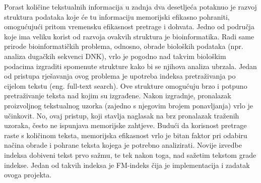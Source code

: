 Porast količine tekstualnih informacija u zadnja dva desetljeća potaknuo je razvoj struktura podataka koje će tu informaciju memorijski efikasno pohraniti, omogućujući pritom vremensku efikasnost pretrage i dohvata. Jedno od područja koje ima veliku korist od razvoja ovakvih struktura je bioinformatika. Radi same prirode bioinformatičkih problema, odnosno, obrade bioloških podataka (npr. analiza dugačkih sekvenci DNK), vrlo je pogodno nad takvim biološkim podacima izgraditi spomenute strukture kako bi se njihova analiza ubrzala.
Jedan od pristupa rješavanja ovog problema je upotreba indeksa pretraživanja po cijelom tekstu (eng. full-text search). Ove strukture omogućuju brzo i potpuno pretraživanje teksta nad kojim su izgrađene. Nakon izgradnje, pronalazak proizvoljnog tekstualnog uzorka (zajedno s njegovim brojem ponavljanja) vrlo je učinkovit. No, ovaj pristup, koji stavlja naglasak na brz pronalazak traženih uzoraka, često ne ispunjava memorijske zahtjeve. Budući da korisnost pretrage raste s količinom teksta, memorijska efikasnost vrlo je bitan faktor pri odabiru načina obrade i pohrane teksta kojega je potrebno analizirati.
Novije izvedbe indeksa dobiveni tekst prvo sažmu, te tek nakon toga, nad sažetim tekstom grade indekse. Jedan od takvih indeksa je FM-indeks čija je implementacija i zadatak ovoga projekta.
